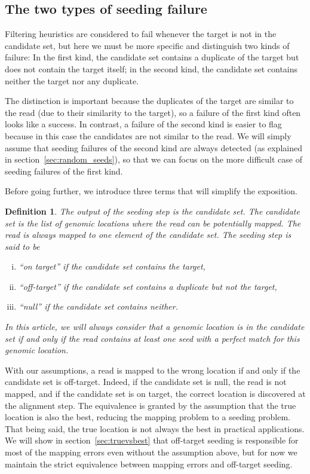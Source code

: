 \documentclass{article}
\newtheorem{definition}{Definition}
\begin{document}
\subsection{The two types of seeding failure}
\label{sec:twotypes}

Filtering heuristics are considered to fail whenever the target is not in
the candidate set, but here we must be more specific and distinguish two
kinds of failure: In the first kind, the candidate set contains a
duplicate of the target but does not contain the target itself; in the
second kind, the candidate set contains neither the target nor any
duplicate.

The distinction is important because the duplicates of the target are
similar to the read (due to their similarity to the target), so a failure
of the first kind often looks like a success. In contrast, a failure of
the second kind is easier to flag because in this case the candidates are
not similar to the read. We will simply assume that seeding failures of
the second kind are always detected (as explained in
section~\ref{sec:random_seeds}), so that we can focus on the more
difficult case of seeding failures of the first kind.

Before going further, we introduce three terms that will simplify the
exposition.

\begin{definition}
The output of the seeding step is the candidate set. The candidate set is
the list of genomic locations where the read can be potentially mapped.
The read is always mapped to one element of the candidate set. The seeding
step is said to be
\begin{enumerate}[i)]
\item ``on target'' if the candidate set contains the target,
\item ``off-target'' if the candidate set contains a duplicate but not the target, 
\item ``null'' if the candidate set contains neither.
\end{enumerate}
In this article, we will always consider that a genomic location is in the
candidate set if and only if the read contains at least one seed with a
perfect match for this genomic location.
\end{definition}

With our assumptions, a read is mapped to the wrong location if and only
if the candidate set is off-target. Indeed, if the candidate set is null,
the read is not mapped, and if the candidate set is on target, the correct
location is discovered at the alignment step. The equivalence is granted
by the assumption that the true location is also the best, reducing the
mapping problem to a seeding problem. That being said, the true location
is not always the best in practical applications. We will show in
section~\ref{sec:truevsbest} that off-target seeding is responsible for
most of the mapping errors even without the assumption above, but for now
we maintain the strict equivalence between mapping errors and off-target
seeding.
\end{document}
